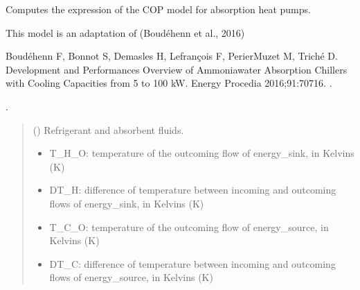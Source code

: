 \documentclass[letterpaper,10pt,english]{sphinxmanual}
\begin{document}
\begin{fulllineitems}
\begin{fulllineitems}
\label{\detokenize{generated/tamos.production.COPModels:tamos.production.COPModels.absorption}}
\pysigstartsignatures
{}
\pysigstopsignatures
\sphinxAtStartPar
Computes the expression of the COP model for absorption heat pumps.

\sphinxAtStartPar
This model is an adaptation of (Boudéhenn et al., 2016) %
\begin{footnote}[2]\sphinxAtStartFootnote
Boudéhenn F, Bonnot S, Demasles H, Lefrançois F, Perier\sphinxhyphen{}Muzet M, Triché D.
Development and Performances Overview of Ammonia\sphinxhyphen{}water Absorption Chillers with Cooling Capacities from 5 to 100 kW.
Energy Procedia 2016;91:707\textendash{}16. .
%
\end{footnote}.
\begin{quote}\begin{description}
\sphinxAtStartPar
{} (\sphinxstyleliteralemphasis{\sphinxupquote{, }}\sphinxstyleliteralemphasis{\sphinxupquote{, }}) \textendash{} Refrigerant and absorbent fluids.

\sphinxAtStartPar
\begin{itemize}
\item {} 
\sphinxAtStartPar
T\_H\_O: temperature of the outcoming flow of energy\_sink, in Kelvins (K)

\item {} 
\sphinxAtStartPar
DT\_H: difference of temperature between incoming and outcoming flows of energy\_sink, in Kelvins (K)

\item {} 
\sphinxAtStartPar
T\_C\_O: temperature of the outcoming flow of energy\_source, in Kelvins (K)

\item {} 
\sphinxAtStartPar
DT\_C: difference of temperature between incoming and outcoming flows of energy\_source, in Kelvins (K)


\end{itemize}
\end{description}
\end{quote}
\end{fulllineitems}
\end{fulllineitems}
\end{document}
